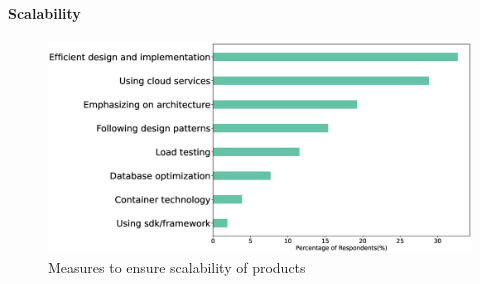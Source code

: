%     
% 
% 
%  
%  
%  
%     
%  


\paragraph{Scalability}
\label{Scalability}
\begin{figure}[h]
\centering
\includegraphics[scale=0.22]{Figures/Scalability.eps} 
\caption{Measures to ensure scalability of products}
\label{fig:Measures to ensure scalability}
\end{figure}

